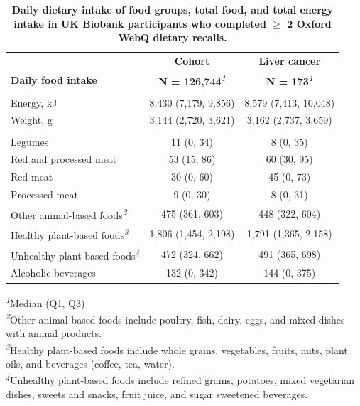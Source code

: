 \documentclass[nutrients,article,submit,moreauthors,pdftex]{Definitions/mdpi}
\begin{document}
\begin{table}[t]
\caption{\label{tab:diet}\textbf{Daily dietary intake of food groups, total food, and total energy intake in UK Biobank participants who completed \(\geq\) 2 Oxford WebQ dietary recalls.}} 
\fontsize{9.0pt}{10.8pt}\selectfont
\begin{tabular*}{1\linewidth}{@{\extracolsep{\fill}}lcc}
\toprule
 & \textbf{Cohort} & \textbf{Liver cancer} \\ 
\cmidrule(lr){2-2} \cmidrule(lr){3-3}
\textbf{Daily food intake} & \textbf{N = 126,744}\textsuperscript{\textit{1}} & \textbf{N = 173}\textsuperscript{\textit{1}} \\ 
\midrule\addlinespace[2.5pt]
\multicolumn{3}{l}{{\bfseries Total food intake}} \\ 
\midrule\addlinespace[2.5pt]
Energy, kJ & 8,430 (7,179, 9,856) & 8,579 (7,413, 10,048) \\ 
Weight, g & 3,144 (2,720, 3,621) & 3,162 (2,737, 3,659) \\ 
\midrule\addlinespace[2.5pt]
\multicolumn{3}{l}{{\bfseries Food groups, g/day}} \\ 
\midrule\addlinespace[2.5pt]
Legumes & 11 (0, 34) & 8 (0, 35) \\ 
Red and processed meat & 53 (15, 86) & 60 (30, 95) \\ 
Red meat & 30 (0, 60) & 45 (0, 73) \\ 
Processed meat & 9 (0, 30) & 8 (0, 31) \\ 
Other animal-based foods\textsuperscript{\textit{2}} & 475 (361, 603) & 448 (322, 604) \\ 
Healthy plant-based foods\textsuperscript{\textit{3}} & 1,806 (1,454, 2,198) & 1,791 (1,365, 2,158) \\ 
Unhealthy plant-based foods\textsuperscript{\textit{4}} & 472 (324, 662) & 491 (365, 698) \\ 
Alcoholic beverages & 132 (0, 342) & 144 (0, 375) \\ 
\bottomrule
\end{tabular*}
\begin{minipage}{\linewidth}
\textsuperscript{\textit{1}}Median (Q1, Q3)\\
\textsuperscript{\textit{2}}Other animal-based foods include poultry, fish, dairy, eggs, and mixed dishes with animal products.\\
\textsuperscript{\textit{3}}Healthy plant-based foods include whole grains, vegetables, fruits, nuts, plant oils, and beverages (coffee, tea, water).\\
\textsuperscript{\textit{4}}Unhealthy plant-based foods include refined grains, potatoes, mixed vegetarian dishes, sweets and snacks, fruit juice, and sugar sweetened beverages.\\
\end{minipage}
\end{table}
\end{document}
